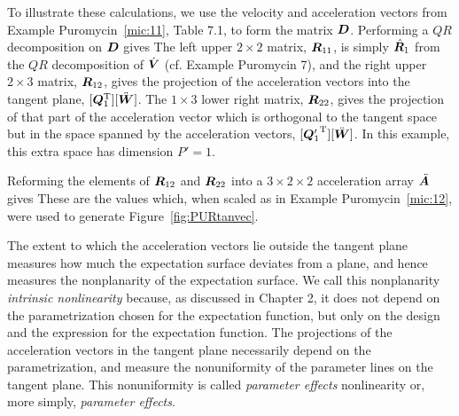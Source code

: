 \begin{example}\label{mic:adotdot}

To illustrate these calculations, we use the velocity and
acceleration vectors from Example Puromycin~\ref{mic:11}, Table 7.1,
to form the matrix ${\boldsymbol D}$.
Performing a $QR$ decomposition on ${\boldsymbol D}$ gives
The left upper $2\times2$ matrix, ${\boldsymbol R}_{11} $, is simply $\hat{{\boldsymbol R}}_{1}$
from the $QR$ decomposition of $\dot {{\boldsymbol V}}$ (cf. Example Puromycin 7),
and the right upper $2\times3$ matrix, ${\boldsymbol R}_{12} $, gives the
projection of the acceleration vectors into the tangent plane,
$ [ \bQ_1 \trans ] [ \ddot{\bW}] $.
The $1\times3$ lower right matrix, ${\boldsymbol R}_{22}$, gives the
projection of that part of the acceleration vector which is orthogonal
to the tangent space but in the space spanned by the acceleration
vectors, $[ {\bQ_1'}\trans ] [ \ddot{\bW}] $.
In this example, this extra space has dimension $P' = 1 $.

Reforming the elements of ${\boldsymbol R}_{12}$ and ${\boldsymbol R}_{22}$
into a $3\times2\times2$ acceleration array $\ddot{{\boldsymbol A}}$ gives
These are the values which, when scaled as in Example Puromycin~\ref{mic:12}, were
used to generate Figure~\ref{fig:PURtanvec}.
\end{example}

The extent to which the acceleration vectors lie outside the
tangent plane measures how much the expectation surface deviates
from a plane, and hence measures the nonplanarity
of the expectation surface.
We call this nonplanarity {\em intrinsic nonlinearity\/} because,
as discussed in Chapter 2, it does not depend on the
parametrization chosen for the expectation function, but
only on the design and the expression for the expectation function.
The projections of the acceleration vectors in the tangent plane
necessarily depend on the parametrization, and measure the
nonuniformity of the parameter lines on the tangent plane.
This nonuniformity is called {\em parameter effects\/} nonlinearity
or, more simply, {\em parameter effects}.

